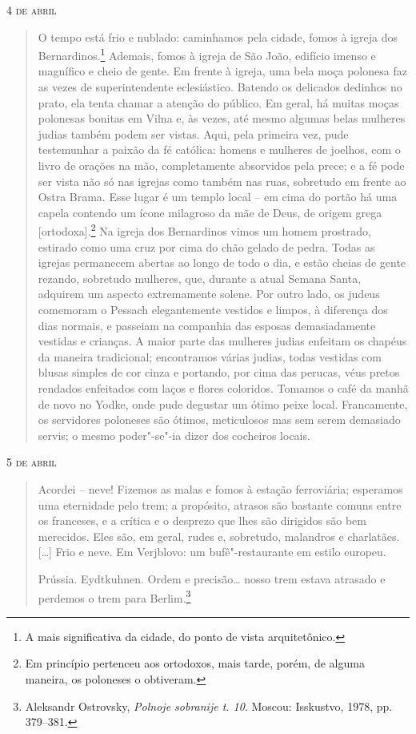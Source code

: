 \begin{flushright}
\smallskip\hfill\textsc{4 de abril}
\end{flushright}
\begin{quote}
O tempo está frio e nublado: caminhamos pela cidade, fomos à igreja dos
Bernardinos.\footnote{A mais significativa da cidade, do ponto de vista
arquitetônico.} Ademais, fomos à igreja de São João, edifício imenso e
magnífico e cheio de gente. Em frente à igreja, uma bela moça polonesa
faz as vezes de superintendente eclesiástico. Batendo os delicados
dedinhos no prato, ela tenta chamar a atenção do público. Em geral, há
muitas moças polonesas bonitas em Vilna e, às vezes, até mesmo algumas
belas mulheres judias também podem ser vistas. Aqui, pela primeira vez,
pude testemunhar a paixão da fé católica: homens e mulheres de joelhos,
com o livro de orações na mão, completamente absorvidos pela prece; e a
fé pode ser vista não só nas igrejas como também nas ruas, sobretudo em
frente ao Ostra Brama. Esse lugar é um templo local -- em cima do portão
há uma capela contendo um ícone milagroso da mãe de Deus, de origem
grega {[}ortodoxa{]}.\footnote{Em princípio pertenceu aos ortodoxos, mais
tarde, porém, de alguma maneira, os poloneses o obtiveram.} Na igreja
dos Bernardinos vimos um homem prostrado, estirado como uma cruz por
cima do chão gelado de pedra. Todas as igrejas permanecem abertas ao
longo de todo o dia, e estão cheias de gente rezando, sobretudo
mulheres, que, durante a atual Semana Santa, adquirem um aspecto
extremamente solene. Por outro lado, os judeus comemoram o Pessach
elegantemente vestidos e limpos, à diferença dos dias normais, e
passeiam na companhia das esposas demasiadamente vestidas e crianças. A
maior parte das mulheres judias enfeitam os chapéus da maneira
tradicional; encontramos várias judias, todas vestidas com blusas
simples de cor cinza e portando, por cima das perucas, véus pretos 
rendados enfeitados com laços e flores coloridos. Tomamos o café da
manhã de novo no Yodke, onde pude degustar um ótimo peixe local.
Francamente, os servidores poloneses são ótimos, meticulosos mas sem
serem demasiado servis; o mesmo poder"-se"-ia dizer dos cocheiros locais.
\end{quote}

\begin{flushright}
\smallskip\hfill\textsc{5 de abril}
\end{flushright}
\begin{quote}
Acordei -- neve! Fizemos as malas e fomos à estação ferroviária;
esperamos uma eternidade pelo trem; a propósito, atrasos são bastante
comuns entre os franceses, e a crítica e o desprezo que lhes são
dirigidos são bem merecidos. Eles são, em geral, rudes e, sobretudo,
malandros e charlatães. [\ldots{}] Frio e neve. Em Verjblovo: um
bufê"-restaurante em estilo europeu.

Prússia. Eydtkuhnen. Ordem e precisão\ldots{} nosso trem estava
atrasado e perdemos o trem para Berlim.\footnote{Aleksandr Ostrovsky, \textit{Polnoje sobranije t. 10}. Moscou: Isskustvo, 1978, pp. 379--381.} 
\end{quote}

